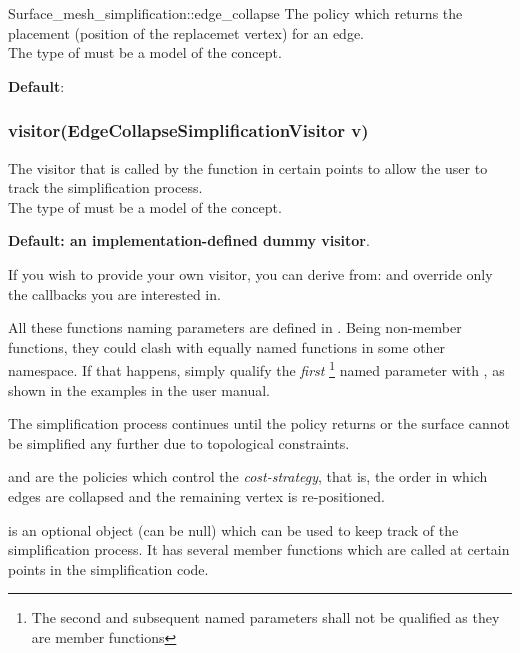 \begin{ccRefFunction}{Surface_mesh_simplification::edge_collapse}
The policy which returns the placement (position of the replacemet vertex)
for an edge.\\
The type of  must be a model of the  concept.

\textbf{Default}: 

\subsubsection*{visitor(EdgeCollapseSimplificationVisitor v)}

The visitor that is called by the  function
in certain points to allow the user to track the simplification process.\\
The type of  must be a model of the  concept.

\textbf{Default: an implementation-defined dummy visitor}.

If you wish to provide your own visitor, you can derive from:
and override only the callbacks you are interested in.




All these functions naming parameters are defined in
. Being non-member functions, they could clash
with equally named functions in some other namespace. If that happens,
simply qualify the {\em first} 
\footnote{The second and subsequent named parameters shall not be qualified as they are member functions}
named parameter with , as shown in the examples in the user manual.


The simplification process continues until the  policy returns 
or the surface cannot be simplified any further due to topological constraints.

 and  are the policies which control
the {\em cost-strategy}, that is, the order in which edges are collapsed 
and the remaining vertex is re-positioned.

 is an optional object (can be null) which can be used
to keep track of the simplification process. It has several member functions which
are called at certain points in the simplification code.

\end{ccRefFunction}




